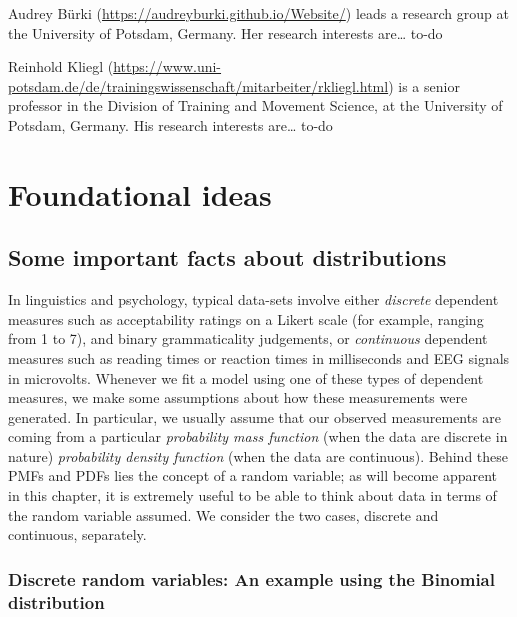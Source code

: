 \documentclass[12pt,]{krantz}
\begin{document}
Audrey Bürki (\url{https://audreyburki.github.io/Website/}) leads a research group at the University of Potsdam, Germany. Her research interests are\ldots{} to-do

Reinhold Kliegl (\url{https://www.uni-potsdam.de/de/trainingswissenschaft/mitarbeiter/rkliegl.html}) is a senior professor in the Division of Training and Movement Science, at the University of Potsdam, Germany. His research interests are\ldots{} to-do

\mainmatter

\hypertarget{part-foundational-ideas}{%
\part{Foundational ideas}\label{part-foundational-ideas}}

\hypertarget{some-important-facts-about-distributions}{%
\chapter{Some important facts about distributions}\label{some-important-facts-about-distributions}}

In linguistics and psychology, typical data-sets involve either \emph{discrete} dependent measures such as acceptability ratings on a Likert scale (for example, ranging from 1 to 7), and binary grammaticality judgements, or \emph{continuous} dependent measures such as reading times or reaction times in milliseconds and EEG signals in microvolts. Whenever we fit a model using one of these types of dependent measures, we make some assumptions about how these measurements were generated. In particular, we usually assume that our observed measurements are coming from a particular \emph{probability mass function} (when the data are discrete in nature) \emph{probability density function} (when the data are continuous). Behind these PMFs and PDFs lies the concept of a random variable; as will become apparent in this chapter, it is extremely useful to be able to think about data in terms of the random variable assumed. We consider the two cases, discrete and continuous, separately.

\hypertarget{discrete-random-variables-an-example-using-the-binomial-distribution}{%
\section{Discrete random variables: An example using the Binomial distribution}\label{discrete-random-variables-an-example-using-the-binomial-distribution}}
\end{document}

